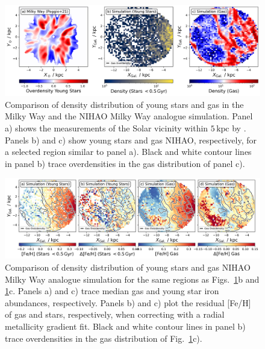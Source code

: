 \documentclass[fleqn,usenatbib]{mnras}
\newcommand{\SB}[1]{{\textcolor{purple}{SB: #1}}}
\begin{document}

\begin{figure}
    \centering
    \includegraphics[width=\textwidth]{figures/overdensities_mw_vs_nihao.png}
    \caption{Comparison of density distribution of young stars and gas in the Milky Way and the NIHAO Milky Way analogue simulation. Panel a) shows the measurements of the Solar vicinity within $5\,\mathrm{kpc}$ by \citet{Poggio2021}. Panels b) and c) show young stars and gas NIHAO, respectively, for a selected region similar to panel a). Black and white contour lines in panel b) trace overdensities in the gas distribution of panel c).}
    \label{fig:overdensities_mw_vs_nihao}
\end{figure}

\begin{figure}
    \centering
    \includegraphics[width=\textwidth]{figures/nihao_gas_stars_density_overlay.png}
    \caption{Comparison of density distribution of young stars and gas NIHAO Milky Way analogue simulation for the same regions as Figs.~\ref{fig:overdensities_mw_vs_nihao}b and \ref{fig:overdensities_mw_vs_nihao}c. Panels a) and c) trace median gas and young star iron abundances, respectively. Panels b) and c) plot the residual [Fe/H] of gas and stars, respectively, when correcting with a radial metallicity gradient fit. Black and white contour lines in panel b) trace overdensities in the gas distribution of Fig.~\ref{fig:overdensities_mw_vs_nihao}c).}
    \label{fig:nihao_gas_stars_density_overlay}
\end{figure}
\end{document}
